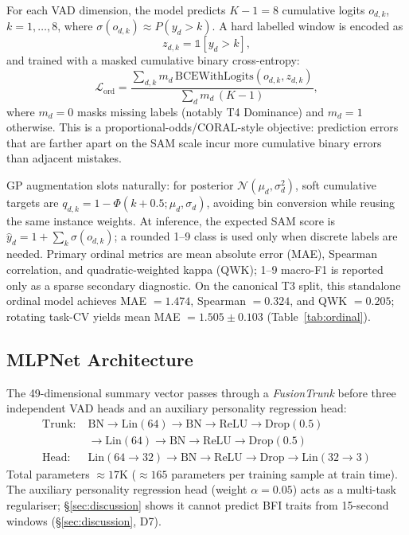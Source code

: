 \documentclass[sigconf,nonacm]{acmart}
\begin{document}
For each VAD dimension, the model predicts $K-1=8$ cumulative logits
$o_{d,k}$, $k=1,\ldots,8$, where
$\sigma(o_{d,k}) \approx P(y_d > k)$.  A hard labelled window is encoded as
\begin{equation}
  z_{d,k} = \mathbb{1}[y_d > k],
\end{equation}
and trained with a masked cumulative binary cross-entropy:
\begin{equation}
  \mathcal{L}_{\text{ord}} =
  \frac{\sum_{d,k} m_d\,\mathrm{BCEWithLogits}(o_{d,k}, z_{d,k})}
       {\sum_d m_d\,(K-1)} ,
\end{equation}
where $m_d=0$ masks missing labels (notably T4 Dominance) and $m_d=1$
otherwise.  This is a proportional-odds/CORAL-style objective: prediction
errors that are farther apart on the SAM scale incur more cumulative binary
errors than adjacent mistakes.

GP augmentation slots naturally: for posterior $\mathcal{N}(\mu_d,\sigma_d^2)$,
soft cumulative targets are $q_{d,k} = 1-\Phi(k+0.5;\mu_d,\sigma_d)$, avoiding
bin conversion while reusing the same instance weights.
At inference, the expected SAM score is $\hat{y}_d = 1 + \sum_k \sigma(o_{d,k})$;
a rounded 1--9 class is used only when discrete labels are needed.
Primary ordinal metrics are mean absolute error (MAE), Spearman correlation,
and quadratic-weighted kappa (QWK); 1--9 macro-F1 is reported only as a sparse
secondary diagnostic.  On the canonical T3 split, this standalone ordinal model
achieves MAE $=1.474$, Spearman $=0.324$, and QWK $=0.205$; rotating task-CV
yields mean MAE $=1.505 \pm 0.103$ (Table~\ref{tab:ordinal}).

\subsection{MLPNet Architecture}
\label{sec:mlp}

The 49-dimensional summary vector passes through a \emph{FusionTrunk}
before three independent VAD heads and an auxiliary personality regression
head:
\begin{align*}
  \text{Trunk:} \; &\text{BN}{\to}\text{Lin}(64){\to}\text{BN}{\to}
    \text{ReLU}{\to}\text{Drop}(0.5) \\
                 &{\to}\text{Lin}(64){\to}\text{BN}{\to}\text{ReLU}{\to}
    \text{Drop}(0.5) \\
  \text{Head:} \; &\text{Lin}(64{\to}32){\to}\text{BN}{\to}
    \text{ReLU}{\to}\text{Drop}{\to}\text{Lin}(32{\to}3)
\end{align*}
Total parameters $\approx 17$K ($\approx 165$ parameters per training
sample at train time).
The auxiliary personality regression head (weight $\alpha = 0.05$) acts
as a multi-task regulariser; \S\ref{sec:discussion} shows it cannot
predict BFI traits from 15-second windows (\S\ref{sec:discussion}, D7).
\end{document}

